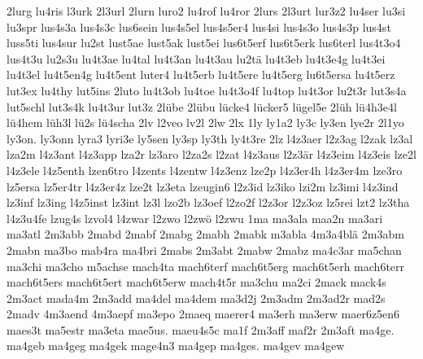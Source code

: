 {    2lurg
    lu4ris
    l3urk
    2l3url
    2lurn
    luro2
    lu4rof
    lu4ror
    2lurs
    2l3urt
    lur3z2
    lu4ser
    lu3si
    lu3spr
    lus4s3a
    lus4s3c
    lus6sein
    lus4s5el
    lus4s5er4
    lus4si
    lus4s3o
    lus4s3p
    lus4st
    luss5ti
    lus4sur
    lu2st
    lust5ae
    lust5ak
    lust5ei
    lus6t5erf
    lus6t5erk
    lus6terl
    lus4t3o4
    lus4t3u
    lu2s3u
    lu4t3ae
    lu4tal
    lu4t3an
    lu4t3au
    lu2tä
    lu4t3eb
    lu4t3e4g
    lu4t3ei
    lu4t3el
    lu4t5en4g
    lu4t5ent
    luter4
    lu4t5erb
    lu4t5ere
    lu4t5erg
    lu6t5ersa
    lu4t5erz
    lut3ex
    lu4thy
    lut5ins
    2luto
    lu4t3ob
    lu4toe
    lu4t3o4f
    lu4top
    lu4t3or
    lu2t3r
    lut3s4a
    lut5schl
    lut3s4k
    lu4t3ur
    lut3z
    2lübe
    2lübu
    lücke4
    lücker5
    lügel5e
    2lüh
    lü4h3e4l
    lü4hem
    lüh3l
    lü2s
    lü4scha
    2lv
    l2veo
    lv2l
    2lw
    2lx
    1ly
    ly1a2
    ly3c
    ly3en
    lye2r
    2l1yo
    ly3on.
    ly3onn
    lyra3
    lyri3e
    ly5sen
    ly3sp
    ly3th
    ly4t3re
    2lz
    l4z3aer
    l2z3ag
    l2zak
    lz3al
    lza2m
    l4z3ant
    l4z3app
    lza2r
    lz3aro
    l2za2s
    l2zat
    l4z3aus
    l2z3är
    l4z3eim
    l4z3eis
    lze2l
    l4z3ele
    l4z5enth
    lzen6tro
    l4zents
    l4zentw
    l4z3enz
    lze2p
    l4z3er4h
    l4z3er4m
    lze3ro
    lz5ersa
    lz5er4tr
    l4z3er4z
    lze2t
    lz3eta
    lzeugin6
    l2z3id
    lz3iko
    lzi2m
    lz3imi
    l4z3ind
    lz3inf
    lz3ing
    l4z5inst
    lz3int
    lz3l
    lzo2b
    lz3oef
    l2zo2f
    l2z3or
    l2z3oz
    lz5rei
    lzt2
    lz3tha
    l4z3u4fe
    lzug4s
    lzvol4
    l4zwar
    l2zwo
    l2zwö
    l2zwu
    1ma
    ma3ala
    maa2n
    ma3ari
    ma3atl
    2m3abb
    2mabd
    2mabf
    2mabg
    2mabh
    2mabk
    m3abla
    4m3a4blä
    2m3abm
    2mabn
    ma3bo
    mab4ra
    ma4bri
    2mabs
    2m3abt
    2mabw
    2mabz
    ma4c3ar
    ma5chan
    ma3chi
    ma3cho
    m5achse
    mach4ta
    mach6terf
    mach6t5erg
    mach6t5erh
    mach6terr
    mach6t5ers
    mach6t5ert
    mach6t5erw
    mach4t5r
    ma3chu
    ma2ci
    2mack
    mack4s
    2m3act
    mada4m
    2m3add
    ma4del
    ma4dem
    ma3d2j
    2m3adm
    2m3ad2r
    mad2s
    2madv
    4m3aend
    4m3aepf
    ma3epo
    2maeq
    maerer4
    ma3erh
    ma3erw
    maer6z5en6
    maes3t
    ma5estr
    ma3eta
    mae5us.
    maeu4s5c
    ma1f
    2m3aff
    maf2r
    2m3aft
    ma4ge.
    ma4geb
    ma4geg
    ma4gek
    mage4n3
    ma4gep
    ma4ges.
    ma4gev
    ma4gew
}
